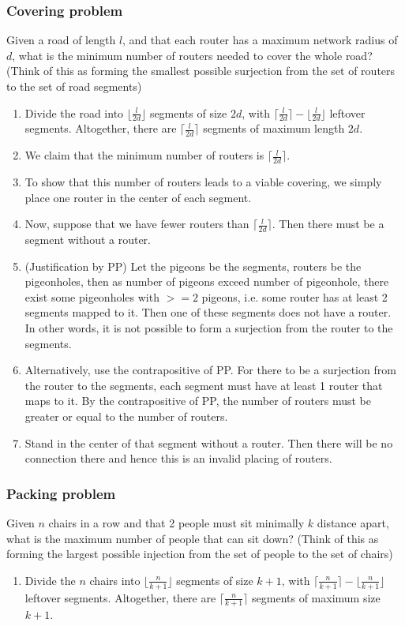 \documentclass{article}
\begin{document}
\subsubsection{Covering problem}
Given a road of length $l$, and that each router has a maximum network radius of $d$, what is the minimum number of routers needed to cover the whole road? (Think of this as forming the smallest possible surjection from the set of routers to the set of road segments)
\begin{enumerate}
    \item Divide the road into $\lfloor \frac{l}{2d} \rfloor$ segments of size $2d$, with $\lceil \frac{l}{2d} \rceil - \lfloor \frac{l}{2d} \rfloor$ leftover segments. Altogether, there are $\lceil \frac{l}{2d} \rceil$ segments of maximum length $2d$.
    \item We claim that the minimum number of routers is $\lceil \frac{l}{2d} \rceil$.
    \item To show that this number of routers leads to a viable covering, we simply place one router in the center of each segment.
    \item Now, suppose that we have fewer routers than $\lceil \frac{l}{2d} \rceil$. Then there must be a segment without a router.
    \item (Justification by PP) Let the pigeons be the segments, routers be the pigeonholes, then as number of pigeons exceed number of pigeonhole, there exist some pigeonholes with $>= 2$ pigeons, i.e. some router has at least 2 segments mapped to it. Then one of these segments does not have a router. 
    In other words, it is not possible to form a surjection from the router to the segments.
    \item Alternatively, use the contrapositive of PP. For there to be a surjection from the router to the segments, each segment must have at least 1 router that maps to it. By the contrapositive of PP, the number of routers must be greater or equal to the number of routers.
    \item Stand in the center of that segment without a router. Then there will be no connection there and hence this is an invalid placing of routers.
\end{enumerate}

\subsubsection{Packing problem}
Given $n$ chairs in a row and that 2 people must sit minimally $k$ distance apart, what is the maximum number of people that can sit down? (Think of this as forming the largest possible injection from the set of people to the set of chairs) 
\begin{enumerate}
    \item Divide the $n$ chairs into $\lfloor \frac{n}{k+1} \rfloor$ segments of size $k+1$, with $\lceil \frac{n}{k+1} \rceil - \lfloor \frac{n}{k+1} \rfloor$ leftover segments. Altogether, there are $\lceil \frac{n}{k+1} \rceil$ segments of maximum size $k+1$.
\end{enumerate}
\end{document}
